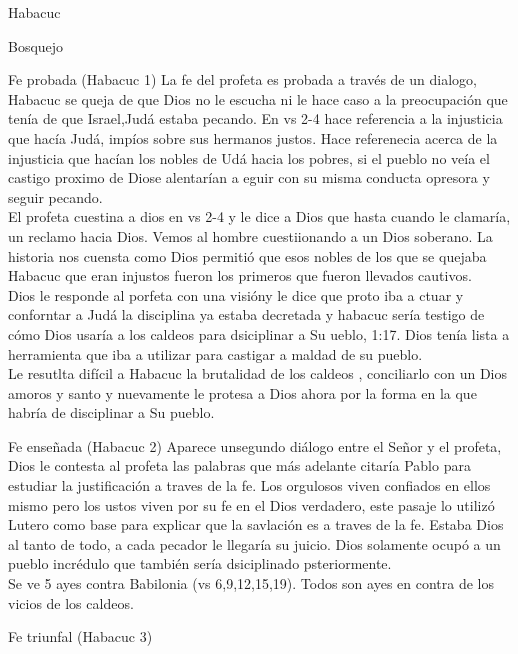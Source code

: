 \documentclass[12pt]{article}
\begin{document}
\begin{section}{Habacuc}
\begin{enumerate}
	\end{enumerate}
	\begin{subsection}{Bosquejo}
		\begin{subsubsection}{Fe probada (Habacuc 1)}
			La fe del profeta es probada a través de un dialogo, Habacuc se queja de que Dios no le escucha ni le hace caso a la preocupación que tenía de que Israel,Judá estaba pecando. En vs 2-4 hace referencia a la injusticia que hacía Judá, impíos sobre sus hermanos justos. Hace referenecia acerca de la injusticia que hacían los nobles de Udá hacia los pobres, si el pueblo no veía el castigo proximo de Diose alentarían a eguir con su misma conducta opresora y seguir pecando.\\
			El profeta cuestina a dios en vs 2-4 y le dice a Dios que hasta cuando le clamaría, un reclamo hacia Dios. Vemos al hombre cuestiionando a un Dios soberano. La historia nos cuensta como Dios permitió que esos nobles de los que se quejaba Habacuc que eran injustos fueron los primeros que fueron llevados cautivos.\\
			Dios le responde al porfeta con una visióny le dice que proto iba a ctuar y conforntar a Judá la disciplina ya estaba decretada y habacuc sería testigo de cómo Dios usaría a los caldeos para dsiciplinar a Su ueblo, 1:17. Dios tenía lista a herramienta que iba a utilizar para castigar a maldad de su pueblo.\\
			Le resutlta difícil a Habacuc la brutalidad de los caldeos , conciliarlo con un Dios amoros y santo y nuevamente le protesa a Dios ahora por la forma en la que habría de disciplinar a Su pueblo. 
		\end{subsubsection}
		\begin{subsubsection}{Fe enseñada (Habacuc 2)}
			Aparece unsegundo diálogo entre el Señor y el profeta, Dios le contesta al profeta las palabras que más adelante citaría Pablo para estudiar la justificación a traves de la fe. Los orgulosos viven confiados en ellos mismo pero los ustos viven por su fe en el Dios verdadero, este pasaje lo utilizó Lutero como base para explicar que la savlación es a traves de la fe. Estaba Dios al tanto de todo, a cada pecador le llegaría su juicio. Dios solamente ocupó a un pueblo incrédulo que también sería dsiciplinado psteriormente.\\
			Se ve 5 ayes contra Babilonia (vs 6,9,12,15,19). Todos son ayes en contra de los vicios de los caldeos.
		\end{subsubsection}
		\begin{subsubsection}{Fe triunfal (Habacuc 3)}

\end{subsubsection}
\end{subsection}
\end{section}
\end{document}
